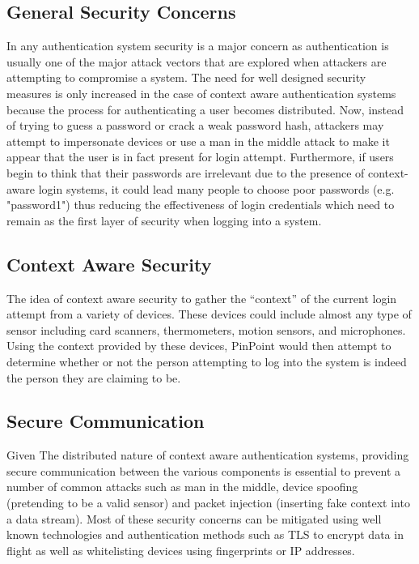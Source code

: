 \documentclass[11pt,journal]{IEEEtran}
\begin{document}
\subsection{General Security Concerns}
In any authentication system security is a major concern as authentication is usually one of the major attack vectors that are explored when attackers are attempting to compromise a system.  The need for well designed security measures is only increased in the case of context aware authentication systems because the process for authenticating a user becomes distributed.  Now, instead of trying to guess a password or crack a weak password hash, attackers may attempt to impersonate devices or use a man in the middle attack to make it appear that the user is in fact present for login attempt.  Furthermore, if users begin to think that their passwords are irrelevant due to the presence of context-aware login systems, it could lead many people to choose poor passwords (e.g. "password1") thus reducing the effectiveness of login credentials which need to remain as the first layer of security when logging into a system.

\subsection{Context Aware Security}
The idea of context aware security to gather the “context” of the current login attempt from a variety of devices.  These devices could include almost any type of sensor including card scanners, thermometers, motion sensors, and microphones.  Using the context provided by these devices, PinPoint would then attempt to determine whether or not the person attempting to log into the system is indeed the person they are claiming to be.

\subsection{Secure Communication}
Given The distributed nature of context aware authentication systems, providing secure communication between the various components is essential to prevent a number of common attacks such as man in the middle, device spoofing (pretending to be a valid sensor) and packet injection (inserting fake context into a data stream).  Most of these security concerns can be mitigated using well known technologies and authentication methods such as TLS to encrypt data in flight as well as whitelisting devices using fingerprints or IP addresses.
\end{document}
